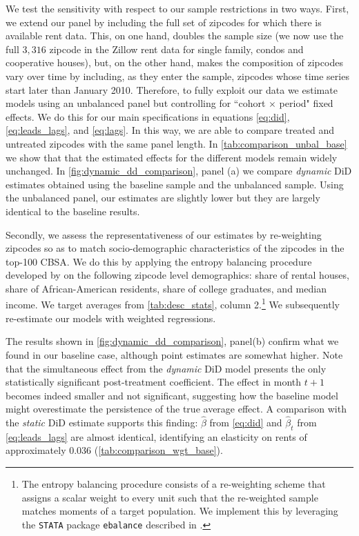 We test the sensitivity with respect to our sample restrictions in two ways. First, we extend our 
panel by including the full set of zipcodes for which there is available rent data. This, on one 
hand, doubles the sample size (we now use the full $3,316$ zipcode in the Zillow rent data for 
single family, condos and cooperative houses), but, on the other hand, makes the composition of 
zipcodes vary over time by including, as they enter the sample, zipcodes whose time series start 
later than January 2010. Therefore, to fully exploit our data we estimate models using an unbalanced 
panel but controlling for ``cohort $\times$ period" fixed effects. We do this for our main 
specifications in equations \eqref{eq:did}, \eqref{eq:leads_lags}, and \eqref{eq:lags}. In this way, 
we are able to compare treated and untreated zipcodes with the same panel length. In 
\autoref{tab:comparison_unbal_base} we show that that the estimated effects for the different models 
remain widely unchanged. In \autoref{fig:dynamic_dd_comparison}, panel (a) we compare 
\textit{dynamic} DiD estimates obtained using the baseline sample and the unbalanced sample. Using 
the unbalanced panel, our estimates are slightly lower but they are largely identical to the baseline 
results.

Secondly, we assess the representativeness of our estimates by re-weighting zipcodes so as to match 
socio-demographic characteristics of the zipcodes in the top-100 CBSA. We do this by applying the 
entropy balancing procedure developed by \cite{hainmueller2012entropy} on the following zipcode 
level demographics: share of rental houses, share of African-American residents, share of college 
graduates, and median income. We target averages from \autoref{tab:desc_stats}, column 
2.\footnote{The entropy balancing procedure consists of a re-weighting scheme that assigns a scalar 
	weight to every unit such that the re-weighted sample matches moments of a target population. We 
	implement this by leveraging the \texttt{STATA} package \texttt{ebalance} described in 
	\textcite{hainmueller2013ebalance}.} 
We subsequently re-estimate our models with weighted regressions.

The results shown in \autoref{fig:dynamic_dd_comparison}, panel(b) confirm what we found in our 
baseline case, although point estimates are somewhat higher. Note that the simultaneous effect from 
the \textit{dynamic} DiD model presents the only statistically significant post-treatment 
coefficient. The effect in month $t+1$ becomes indeed smaller and not significant, suggesting how 
the baseline model might overestimate the persistence of the true average effect. A comparison with 
the \textit{static} DiD estimate supports this finding: $\hat{\beta}$ from \autoref{eq:did} and 
$\hat{\beta}_{t}$ from \autoref{eq:leads_lags} are almost identical, identifying an elasticity on 
rents of approximately $0.036$ (\autoref{tab:comparison_wgt_base}).

